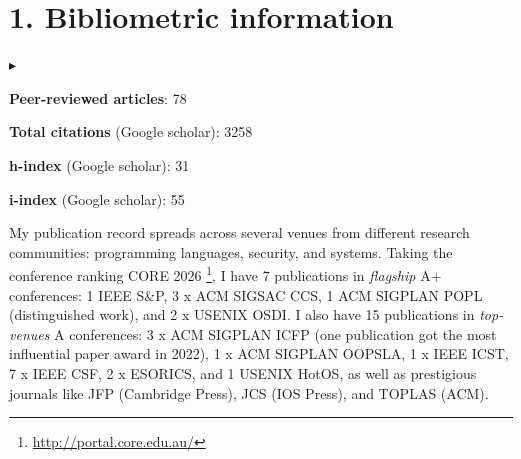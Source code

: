 \documentclass{kawcv}
\newenvironment{CompactItemize}%
  {\begin{list}{$\blacktriangleright$}%
   {\leftmargin=16pt \itemsep=2pt \topsep=2pt
     \parsep=0pt \partopsep=0pt}}%
  {\end{list}}
\begin{document}
\onecolumn


\section{1. Bibliometric information}

\begin{CompactItemize}

\item \textbf{Peer-reviewed articles}: 78 
\item \textbf{Total citations} (Google scholar): 3258
\item \textbf{h-index} (Google scholar): 31
\item \textbf{i-index} (Google scholar): 55

My publication record spreads across several venues from different research
communities: programming languages, security, and systems.
%
Taking the conference ranking CORE 2026 \footnote{\url{http://portal.core.edu.au/}},
I have 7 publications in \emph{flagship} A+ conferences: 1 IEEE S\&P, 3 x ACM
SIGSAC CCS, 1 ACM SIGPLAN POPL (distinguished work), and 2 x USENIX OSDI.
%
I also have 15 publications in \emph{top-venues} A conferences: 3 x ACM SIGPLAN
ICFP (one publication got the most influential paper award in 2022), 1 x ACM
SIGPLAN OOPSLA, 1 x IEEE ICST, 7 x IEEE CSF, 2 x ESORICS, and 1 USENIX HotOS,
as well as prestigious journals like JFP (Cambridge Press), JCS (IOS Press),
and TOPLAS (ACM).

\end{CompactItemize}
\end{document}
